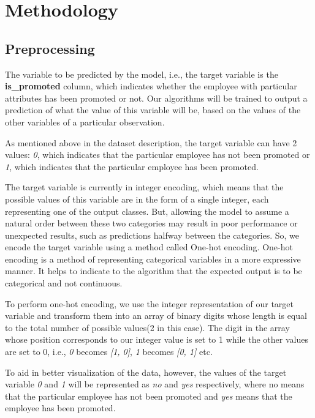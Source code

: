 \documentclass[runningheads]{llncs}
\begin{document}
\hypertarget{methodology}{%
\section{Methodology}\label{methodology}}

\hypertarget{preprocessing}{%
\subsection{Preprocessing}\label{preprocessing}}

The variable to be predicted by the model, i.e., the target variable is
the \textbf{is\_promoted} column, which indicates whether the employee
with particular attributes has been promoted or not. Our algorithms will
be trained to output a prediction of what the value of this variable
will be, based on the values of the other variables of a particular
observation.

As mentioned above in the dataset description, the target variable can
have 2 values: \emph{0}, which indicates that the particular employee
has not been promoted or \emph{1}, which indicates that the particular
employee has been promoted.

The target variable is currently in integer encoding, which means that
the possible values of this variable are in the form of a single
integer, each representing one of the output classes. But, allowing the
model to assume a natural order between these two categories may result
in poor performance or unexpected results, such as predictions halfway
between the categories. So, we encode the target variable using a method
called One-hot encoding. One-hot encoding is a method of representing
categorical variables in a more expressive manner. It helps to indicate
to the algorithm that the expected output is to be categorical and not
continuous.

To perform one-hot encoding, we use the integer representation of our
target variable and transform them into an array of binary digits whose
length is equal to the total number of possible values(2 in this case).
The digit in the array whose position corresponds to our integer value
is set to 1 while the other values are set to 0, i.e., \emph{0} becomes
\emph{{[}1, 0{]}}, \emph{1} becomes \emph{{[}0, 1{]}} etc.

To aid in better visualization of the data, however, the values of the
target variable \emph{0} and \emph{1} will be represented as \emph{no}
and \emph{yes} respectively, where no means that the particular employee
has not been promoted and \emph{yes} means that the employee has been
promoted.
\end{document}
